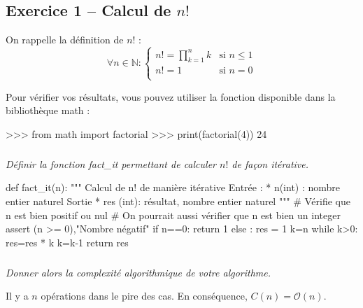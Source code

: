 \documentclass[10pt,fleqn]{article} %
\begin{document}

\vspace{10cm}
\pagestyle{fancy}
\thispagestyle{plain}


\def\columnseprulecolor{\color{ocre}}
\setlength{\columnseprule}{0.4pt} 
\begin{multicols}{2}

\subsection*{Exercice 1 -- Calcul de $n!$}

\noindent 
On rappelle la définition de $n!$ :
$$
\forall n\in \mathbb{N} : \left\{ \begin{array}{ll}
n!= \prod_{k=1}^n k & \text{si } n\leq1 \\
n!= 1 & \text{si } n=0 \\
\end{array} \right.
$$

\begin{rem}
Pour vérifier vos résultats, vous pouvez utiliser la fonction disponible dans la bibliothèque \textsf{math} : 
\begin{python}
>>> from math import factorial
>>> print(factorial(4)) 
       24
\end{python}
\end{rem}
\subparagraph{}
\textit{Définir la fonction \textsf{fact\_it} permettant de calculer $n!$ de façon itérative.}
\ifprof
\begin{corrige}
\begin{python}
def fact_it(n):
    """
    Calcul de n! de manière itérative
    Entrée : 
     * n(int) : nombre entier naturel
    Sortie 
     * res (int): résultat, nombre entier naturel
    """
    # Vérifie que n est bien positif ou nul
    # On pourrait aussi vérifier que n est bien un integer
    assert (n >= 0),"Nombre négatif" 
    if n==0:
        return 1
    else :
        res = 1
        k=n
        while k>0:
            res=res * k
            k=k-1
        return res
\end{python}
\end{corrige}
\else
\fi


\subparagraph{}
\textit{Donner alors la complexité algorithmique de votre algorithme.}
\ifprof
\begin{corrige}
Il y a $n$ opérations dans le pire des cas. En conséquence, $C(n)=\mathcal{O}(n)$.
\end{corrige}
\else
\fi


\end{multicols}
\end{document}
